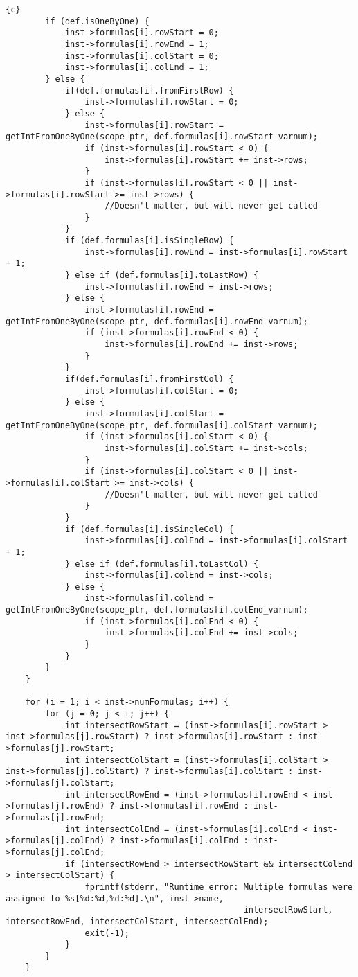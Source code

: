 \begin{lstlisting}{c}
		if (def.isOneByOne) {
			inst->formulas[i].rowStart = 0;
			inst->formulas[i].rowEnd = 1;
			inst->formulas[i].colStart = 0;
			inst->formulas[i].colEnd = 1;
		} else {
			if(def.formulas[i].fromFirstRow) {
				inst->formulas[i].rowStart = 0;
			} else {
				inst->formulas[i].rowStart = getIntFromOneByOne(scope_ptr, def.formulas[i].rowStart_varnum);
				if (inst->formulas[i].rowStart < 0) {
					inst->formulas[i].rowStart += inst->rows;
				}
				if (inst->formulas[i].rowStart < 0 || inst->formulas[i].rowStart >= inst->rows) {
					//Doesn't matter, but will never get called
				}
			}
			if (def.formulas[i].isSingleRow) {
				inst->formulas[i].rowEnd = inst->formulas[i].rowStart + 1;
			} else if (def.formulas[i].toLastRow) {
				inst->formulas[i].rowEnd = inst->rows;
			} else {
				inst->formulas[i].rowEnd = getIntFromOneByOne(scope_ptr, def.formulas[i].rowEnd_varnum);
				if (inst->formulas[i].rowEnd < 0) {
					inst->formulas[i].rowEnd += inst->rows;
				}
			}
			if(def.formulas[i].fromFirstCol) {
				inst->formulas[i].colStart = 0;
			} else {
				inst->formulas[i].colStart = getIntFromOneByOne(scope_ptr, def.formulas[i].colStart_varnum);
				if (inst->formulas[i].colStart < 0) {
					inst->formulas[i].colStart += inst->cols;
				}
				if (inst->formulas[i].colStart < 0 || inst->formulas[i].colStart >= inst->cols) {
					//Doesn't matter, but will never get called
				}
			}
			if (def.formulas[i].isSingleCol) {
				inst->formulas[i].colEnd = inst->formulas[i].colStart + 1;
			} else if (def.formulas[i].toLastCol) {
				inst->formulas[i].colEnd = inst->cols;
			} else {
				inst->formulas[i].colEnd = getIntFromOneByOne(scope_ptr, def.formulas[i].colEnd_varnum);
				if (inst->formulas[i].colEnd < 0) {
					inst->formulas[i].colEnd += inst->cols;
				}
			}
		}
	}

	for (i = 1; i < inst->numFormulas; i++) {
		for (j = 0; j < i; j++) {
			int intersectRowStart = (inst->formulas[i].rowStart > inst->formulas[j].rowStart) ? inst->formulas[i].rowStart : inst->formulas[j].rowStart;
			int intersectColStart = (inst->formulas[i].colStart > inst->formulas[j].colStart) ? inst->formulas[i].colStart : inst->formulas[j].colStart;
			int intersectRowEnd = (inst->formulas[i].rowEnd < inst->formulas[j].rowEnd) ? inst->formulas[i].rowEnd : inst->formulas[j].rowEnd;
			int intersectColEnd = (inst->formulas[i].colEnd < inst->formulas[j].colEnd) ? inst->formulas[i].colEnd : inst->formulas[j].colEnd;
			if (intersectRowEnd > intersectRowStart && intersectColEnd > intersectColStart) {
				fprintf(stderr, "Runtime error: Multiple formulas were assigned to %s[%d:%d,%d:%d].\n", inst->name,
												intersectRowStart, intersectRowEnd, intersectColStart, intersectColEnd);
				exit(-1);
			}
		}
	}


\end{lstlisting}
